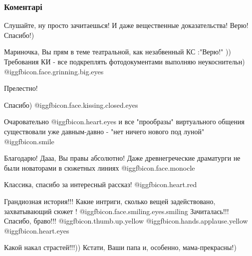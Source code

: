  
 
 
 
 
\subsubsection{Коментарі}
\label{sec:21_01_2020.fb.fb_group.story_kiev_ua.1.elegii_prodolzhenie.cmt}

\begin{itemize} %
Слушайте, ну просто зачитаешься! И даже вещественные доказательства! Верю! Спасибо!)

\begin{itemize} %

Мариночка, Вы прям в теме театральной, как незабвенный КС :"Верю!" ))
Требования КИ - все подкреплять фотодокументами выполняю неукоснительн) @igg{fbicon.face.grinning.big.eyes} 

\end{itemize} %

Прелестно!

Спасибо) @igg{fbicon.face.kissing.closed.eyes} 

Очаровательно @igg{fbicon.heart.eyes}  и все "прообразы" виртуального общения существовали уже давным-давно - "нет ничего нового под луной" @igg{fbicon.smile} 

\begin{itemize} %
Благодарю! Дааа, Вы правы абсолютно! Даже древнегреческие драматурги не были новаторами в сюжетных линиях @igg{fbicon.face.monocle} 

Классика, спасибо за интересный рассказ! @igg{fbicon.heart.red}
\end{itemize} %

Грандиозная история!!! Какие интриги, сколько вещей задействовано, захватывающий сюжет !  @igg{fbicon.face.smiling.eyes.smiling} Зачиталась!!! Спасибо, браво!!!  @igg{fbicon.thumb.up.yellow}  @igg{fbicon.hands.applause.yellow}  @igg{fbicon.heart.eyes} 

Какой накал страстей!!!)) Кстати, Ваши папа и, особенно, мама-прекрасны!)


\end{itemize}
